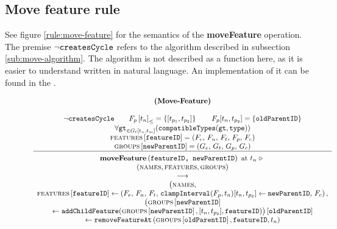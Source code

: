 \subsection{Move feature rule}
\label{sub:move-feature-rule}
See figure \vref{rule:move-feature} for the semantics of the \textbf{moveFeature} operation. The premise $\neg \texttt{createsCycle}$ refers to the algorithm described in subsection \vref{sub:move-algorithm}. The algorithm is not described as a function here, as it is easier to understand written in natural language. An implementation of it can be found in the .

\begin{figure}[h]
    \renewcommand{\arraystretch}{1.1}
    \sossize$$\begin{array}{c}
      \ntyperule{Move-Feature}
      {\\
        \neg \var{createsCycle} \qquad
        \containing{F_p}{t_n} = \set{\interval{t_{p_1}}{t_{p_2}}} \qquad
        F_p \interval{t_n}{t_{p_2}} = \set{\var{oldParentID}} \\
        \forall \var{gt}_{\in G_t\interval{t_n}{t_m}} (\var{compatibleTypes}(\var{gt}, \var{type})) \\
        \lookup{\features{}}{\var{featureID}} = \left(F_e,\, F_n,\, F_t,\, F_p,\, F_c \right) \\
        \lookup{\groups{}}{\var{newParentID}} = \left( G_e,\, G_t,\, G_p,\, G_c \right)
      }
      {
        \textbf{moveFeature}\left( \var{featureID, newParentID}\right) \text{ at } t_n \shove \\
        (\names{}, \features{}, \groups{}) \\
        \transition \\
        \big(\names,\\
        \lookup{\features{}}{\var{featureID}} \assign \left( F_e,\, F_n,\, F_t,\, 
        \var{clampInterval}(F_p, t_n)\interval{t_n}{t_{p_2}} \assign \var{newParentID},\, F_c \right), \\
        \lookup{\big(\lookup{\groups{}}{\var{newParentID}} \\
        \assign \var{addChildFeature}(\lookup{\groups{}}{\var{newParentID}}, \interval{t_n}{t_{p_2}}, \var{featureID})\big)}{\var{oldParentID}} \\
        \assign 
      \var{removeFeatureAt}\left(\lookup{\groups{}}{\var{oldParentID}}, \var{featureID}, t_n\right)}
    \end{array}$$
  \caption{\label{rule:move-feature}}
\end{figure}


